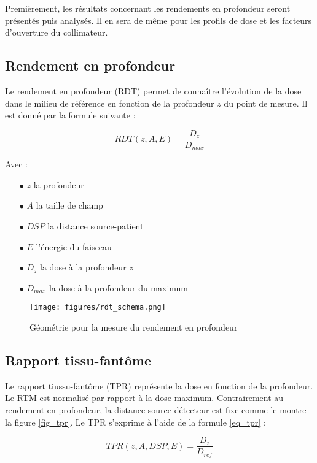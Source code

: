 \documentclass{article}
\begin{document}
Premièrement, les résultats concernant les rendements en profondeur seront présentés puis analysés. Il en sera de même pour les profils de dose et les facteurs d'ouverture du collimateur.

\newpage
\subsection{Rendement en profondeur}

Le rendement en profondeur (RDT) permet de connaître l'évolution de la dose dans le milieu de référence en fonction de la profondeur $z$ du point de mesure. Il est donné par la formule suivante :

\begin{equation}
    RDT(z, A, E) = \dfrac{D_z}{D_{max}}
    \label{eq_rdt}
\end{equation}

Avec :

\begin{itemize}
    \item[$\bullet$] $z$ la profondeur
    \item[$\bullet$] $A$ la taille de champ
    \item[$\bullet$] $DSP$ la distance source-patient
    \item[$\bullet$] $E$ l'énergie du faisceau
    \item[$\bullet$] $D_z$ la dose à la profondeur $z$
    \item[$\bullet$] $D_{max}$ la dose à la profondeur du maximum
\end{itemize}

\begin{figure}[h]
  \centering
  \texttt{[image: figures/rdt\_schema.png]}
  \caption{Géométrie pour la mesure du rendement en profondeur}
  \label{fig_rdt}
\end{figure}

\subsection{Rapport tissu-fantôme}

Le rapport tiussu-fantôme (TPR) représente la dose en fonction de la profondeur. Le RTM est normalisé par rapport à la dose maximum. Contrairement au rendement en profondeur, la distance source-détecteur est fixe comme le montre la figure \ref*{fig_tpr}. Le TPR s'exprime à l'aide de la formule \ref{eq_tpr} :

\begin{equation}
    TPR(z, A, DSP, E) = \dfrac{D_z}{D_{ref}}
    \label{eq_tpr}
\end{equation}
\end{document}
